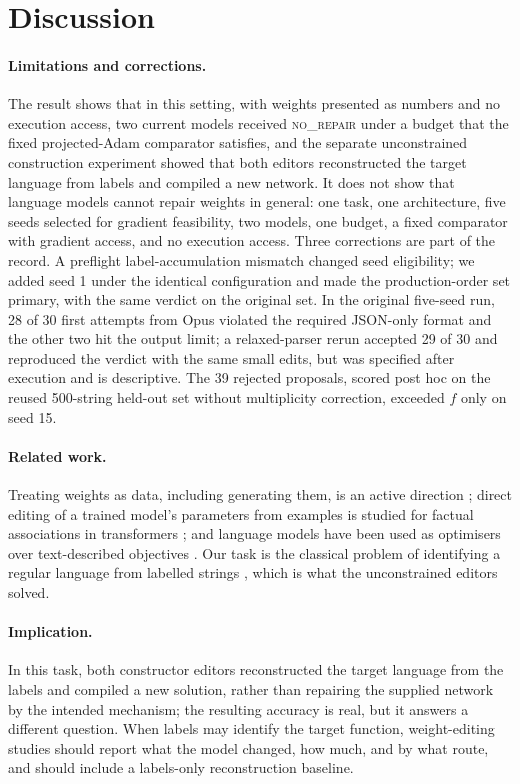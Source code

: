 \documentclass{article}
\begin{document}
\section{Discussion}

\paragraph{Limitations and corrections.} The result shows that in this setting, with weights presented as numbers and no execution access, two current models received \textsc{no\_repair} under a budget that the fixed projected-Adam comparator satisfies, and the separate unconstrained construction experiment showed that both editors reconstructed the target language from labels and compiled a new network. It does not show that language models cannot repair weights in general: one task, one architecture, five seeds selected for gradient feasibility, two models, one budget, a fixed comparator with gradient access, and no execution access. Three corrections are part of the record. A preflight label-accumulation mismatch changed seed eligibility; we added seed 1 under the identical configuration and made the production-order set primary, with the same verdict on the original set. In the original five-seed run, 28 of 30 first attempts from Opus violated the required JSON-only format and the other two hit the output limit; a relaxed-parser rerun accepted 29 of 30 and reproduced the verdict with the same small edits, but was specified after execution and is descriptive. The 39 rejected proposals, scored post hoc on the reused 500-string held-out set without multiplicity correction, exceeded $f$ only on seed 15.

\paragraph{Related work.} Treating weights as data, including generating them, is an active direction \citep{ha2016hypernetworks,wsl2026survey}; direct editing of a trained model's parameters from examples is studied for factual associations in transformers \citep{meng2022rome,mitchell2022mend}; and language models have been used as optimisers over text-described objectives \citep{yang2023opro}. Our task is the classical problem of identifying a regular language from labelled strings \citep{gold1978complexity,angluin1987learning}, which is what the unconstrained editors solved.

\paragraph{Implication.} In this task, both constructor editors reconstructed the target language from the labels and compiled a new solution, rather than repairing the supplied network by the intended mechanism; the resulting accuracy is real, but it answers a different question. When labels may identify the target function, weight-editing studies should report what the model changed, how much, and by what route, and should include a labels-only reconstruction baseline.
\end{document}
